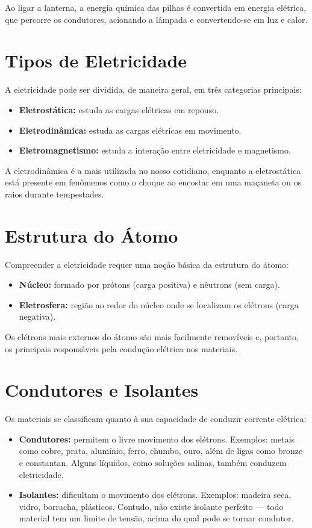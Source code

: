 Ao ligar a lanterna, a energia química das pilhas é convertida em energia elétrica, que percorre os condutores, acionando a lâmpada e convertendo-se em luz e calor.

\section{Tipos de Eletricidade}

A eletricidade pode ser dividida, de maneira geral, em três categorias principais:

\begin{itemize}
    \item \textbf{Eletrostática:} estuda as cargas elétricas em repouso.
    \item \textbf{Eletrodinâmica:} estuda as cargas elétricas em movimento.
    \item \textbf{Eletromagnetismo:} estuda a interação entre eletricidade e magnetismo.
\end{itemize}

A eletrodinâmica é a mais utilizada no nosso cotidiano, enquanto a eletrostática está presente em fenômenos como o choque ao encostar em uma maçaneta ou os raios durante tempestades.

\section{Estrutura do Átomo}

Compreender a eletricidade requer uma noção básica da estrutura do átomo:

\begin{itemize}
    \item \textbf{Núcleo:} formado por prótons (carga positiva) e nêutrons (sem carga).
    \item \textbf{Eletrosfera:} região ao redor do núcleo onde se localizam os elétrons (carga negativa).
\end{itemize}

Os elétrons mais externos do átomo são mais facilmente removíveis e, portanto, os principais responsáveis pela condução elétrica nos materiais.

\section{Condutores e Isolantes}
Os materiais se classificam quanto à sua capacidade de conduzir corrente elétrica:

\begin{itemize}
    \item \textbf{Condutores:} permitem o livre movimento dos elétrons. Exemplos: metais como cobre, prata, alumínio, ferro, chumbo, ouro, além de ligas como bronze e constantan. Alguns líquidos, como soluções salinas, também conduzem eletricidade.
    
    \item \textbf{Isolantes:} dificultam o movimento dos elétrons. Exemplos: madeira seca, vidro, borracha, plásticos. Contudo, não existe isolante perfeito — todo material tem um limite de tensão, acima do qual pode se tornar condutor.
\end{itemize}

